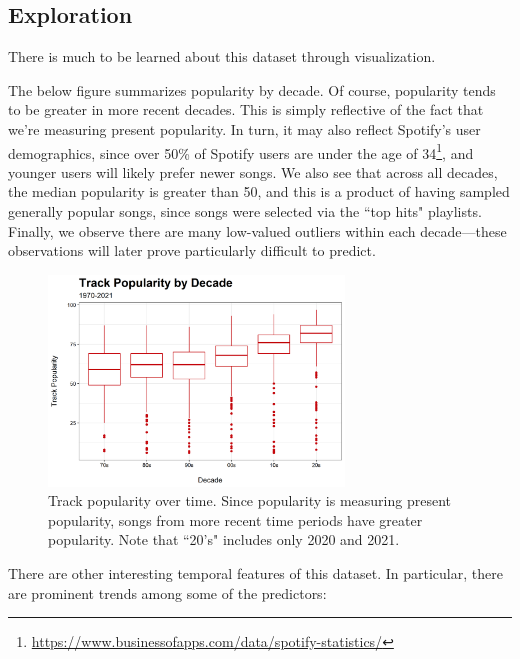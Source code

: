 \documentclass[12pt, twoside]{article}
\begin{document}
\subsection{Exploration}
There is much to be learned about this dataset through visualization.

The below figure summarizes popularity by decade. Of course, popularity tends to be greater in more recent decades. This is simply reflective of the fact that we're measuring present popularity. In turn, it may also reflect Spotify's user demographics, since over 50\% of Spotify users are under the age of 34\footnote{\href{https://www.businessofapps.com/data/spotify-statistics/}{https://www.businessofapps.com/data/spotify-statistics/}}, and younger users will likely prefer newer songs. We also see that across all decades, the median popularity is greater than 50, and this is a product of having sampled generally popular songs, since songs were selected via the ``top hits" playlists. Finally, we observe there are many low-valued outliers within each decade---these observations will later prove particularly difficult to predict.

\begin{figure}[H] %
\centering
\includegraphics[width=0.7\textwidth]{track_pop_decade.png} %
\caption{Track popularity over time. Since popularity is measuring present popularity, songs from more recent time periods have greater popularity. Note that ``20's" includes only 2020 and 2021.}
\label{fig:track_pop_decade} %
\end{figure}

There are other interesting temporal features of this dataset. In particular, there are prominent trends among some of the predictors:
\end{document}
